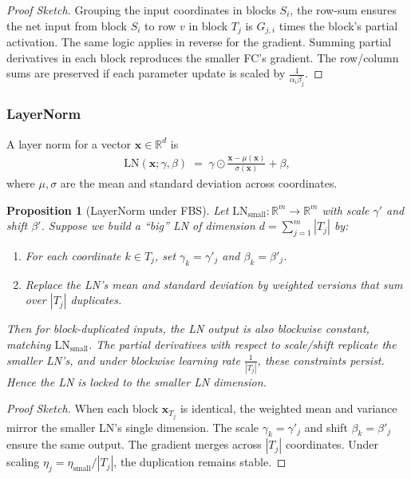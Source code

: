 \documentclass[11pt]{article}
\newtheorem{proposition}{Proposition}[section]
\begin{document}
\begin{proof}[Proof Sketch]
Grouping the input coordinates in blocks $S_i$, the row-sum ensures the net input from block $S_i$ to row $v$ in block $T_j$ is $G_{j,i}$ times the block's partial activation. The same logic applies in reverse for the gradient. Summing partial derivatives in each block reproduces the smaller FC's gradient. The row/column sums are preserved if each parameter update is scaled by $\frac{1}{\alpha_i\beta_j}$.
\end{proof}

\subsubsection{LayerNorm}
A layer norm for a vector $\mathbf{x}\in\mathbb{R}^d$ is
\begin{align*}
  \mathrm{LN}(\mathbf{x};\gamma,\beta)
  \;=\;
  \gamma\odot \frac{\mathbf{x}-\mu(\mathbf{x})}{\sigma(\mathbf{x})} + \beta,
\end{align*}
where $\mu,\sigma$ are the mean and standard deviation across coordinates.

\begin{proposition}[LayerNorm under FBS]
\label{prop:LN_FBS}
Let $\mathrm{LN}_{\text{small}}\colon \mathbb{R}^{m}\to\mathbb{R}^{m}$ with scale $\gamma'$ and shift $\beta'$. Suppose we build a ``big'' LN of dimension $d=\sum_{j=1}^m |T_j|$ by:
\begin{enumerate}
    \item For each coordinate $k\in T_j$, set $\gamma_k=\gamma'_j$ and $\beta_k=\beta'_j$.
    \item Replace the LN's mean and standard deviation by weighted versions that sum over $|T_j|$ duplicates.
\end{enumerate}
Then for block-duplicated inputs, the LN output is also blockwise constant, matching $\mathrm{LN}_{\text{small}}$. The partial derivatives with respect to scale/shift replicate the smaller LN's, and under blockwise learning rate $\frac{1}{|T_j|}$, these constraints persist. Hence the LN is locked to the smaller LN dimension.
\end{proposition}

\begin{proof}[Proof Sketch]
When each block $\mathbf{x}_{T_j}$ is identical, the weighted mean and variance mirror the smaller LN's single dimension. The scale $\gamma_k=\gamma'_j$ and shift $\beta_k=\beta'_j$ ensure the same output. The gradient merges across $|T_j|$ coordinates. Under scaling $\eta_{j} = \eta_{\text{small}} / |T_j|$, the duplication remains stable.
\end{proof}
\end{document}
